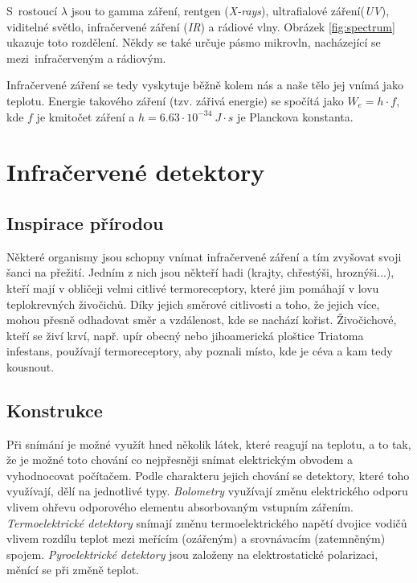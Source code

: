 \documentclass[10pt,a4paper,titlepage]{article}
\begin{document}
  S~rostoucí $\lambda$ jsou to gamma záření, rentgen ({\it X-rays}), ultrafialové záření({\it UV}),
  viditelné světlo, infračervené záření ({\it IR}) a rádiové vlny. Obrázek \ref{fig:spectrum} ukazuje
  toto rozdělení. Někdy se také určuje pásmo mikrovln, nacházející se mezi~infračerveným a rádiovým.

  Infračervené záření se tedy vyskytuje běžně kolem nás a naše tělo jej vnímá jako teplotu. Energie
  takového záření (tzv. zářivá energie) se spočítá jako $W_e=h\cdot f$, kde $f$ je kmitočet záření
  a $h=6.63\cdot10^{-34}~J\cdot s $ je Planckova konstanta. \cite{WikipediaInfrared}

  \section{Infračervené detektory}
  \subsection{Inspirace přírodou}
  Některé organismy jsou schopny vnímat infračervené záření a tím zvyšovat svoji šanci na přežití.
  Jedním z nich jsou někteří hadi (krajty, chřestýši, hroznýši...), kteří mají v obličeji velmi citlivé
  termoreceptory, které jim pomáhají v lovu teplokrevných živočichů. Díky jejich směrové citlivosti
  a toho, že jejich více, mohou přesně odhadovat směr a vzdálenost, kde se nachází kořist. \cite{SnakeInfrared}
  Živočichové, kteří se živí krví, např. upír obecný nebo jihoamerická ploštice Triatoma infestans,
  používají termoreceptory, aby poznali místo, kde je céva a kam tedy kousnout.

  \subsection{Konstrukce}
  Při snímání je možné využít hned několik látek, které reagují na teplotu, a to tak, že je možné
  toto chování co nejpřesněji snímat elektrickým obvodem a vyhodnocovat počítačem. Podle
  charakteru jejich chování se detektory, které toho využívají, dělí na jednotlivé typy.
  {\it Bolometry} využívají změnu elektrického odporu vlivem ohřevu odporového elementu
  absorbovaným vstupním zářením. {\it Termoelektrické detektory} snímají změnu termoelektrického
  napětí dvojice vodičů vlivem rozdílu teplot mezi meřícím (ozářeným) a srovnávacím (zatemněným)
  spojem. {\it Pyroelektrické detektory} jsou založeny na elektrostatické polarizaci, měnící se při
  změně teplot. \cite{DetectorsBook}
\end{document}
